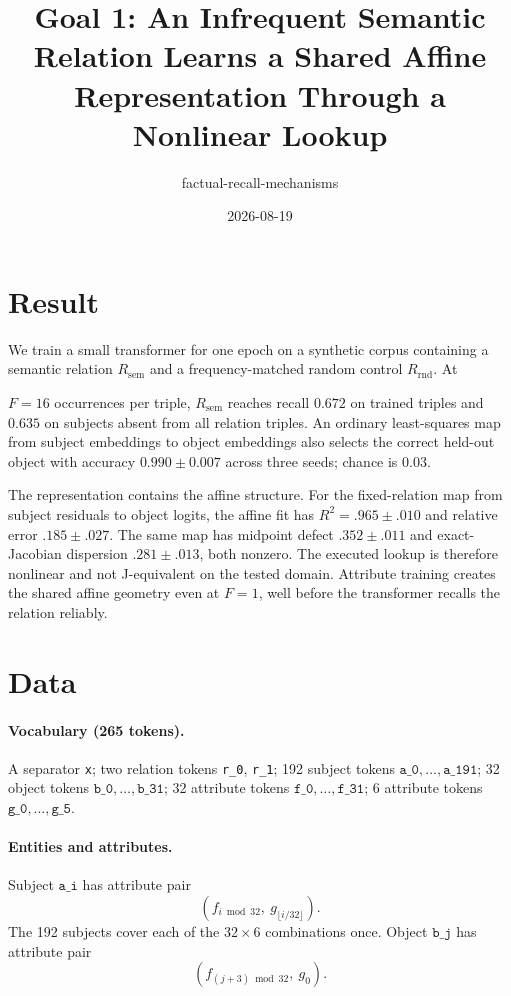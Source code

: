 \documentclass[11pt]{article}
\title{Goal 1: An Infrequent Semantic Relation Learns a Shared Affine Representation Through a Nonlinear Lookup}
\author{factual-recall-mechanisms}
\date{2026-08-19}
\newcommand{\sep}{\texttt{x}}
\newcommand{\subj}[1]{\texttt{a\_#1}}
\newcommand{\obj}[1]{\texttt{b\_#1}}
\newcommand{\rel}[1]{\texttt{r\_#1}}
\newcommand{\fatt}[1]{\texttt{f\_#1}}
\newcommand{\gatt}[1]{\texttt{g\_#1}}
\newcommand{\Rsem}{R_{\mathrm{sem}}}
\newcommand{\Rrnd}{R_{\mathrm{rnd}}}
\providecommand{\enote}[2]{}
\begin{document}
\maketitle

\section{Result}

We train a small transformer for one epoch on a synthetic corpus containing a
semantic relation $\Rsem$ and a frequency-matched random control $\Rrnd$.  At
\enote{hs}{``exactly one epoch'' is completely vacuous?}
$F{=}16$ occurrences per triple, $\Rsem$ reaches recall $0.672$ on trained triples
and $0.635$ on subjects absent from all relation triples.  An ordinary least-squares
map from subject embeddings to object embeddings also selects the correct held-out
object with accuracy $0.990\pm0.007$ across three seeds; chance is $0.03$.
\enote{hs}{but the important question is whether the object of a held-out triple
is correctly predicted, not the subject? -- now i understand. nice!}

The representation contains the affine structure.  For the fixed-relation map
from subject residuals to object logits, the affine fit
has $R^2=.965\pm.010$ and relative error $.185\pm.027$.  The same map has midpoint
defect $.352\pm.011$ and exact-Jacobian dispersion $.281\pm.013$, both nonzero.
The executed lookup is therefore nonlinear and not J-equivalent on the tested
domain.  Attribute training creates the shared affine geometry even at $F{=}1$,
well before the transformer recalls the relation reliably.

\section{Data}

\paragraph{Vocabulary (265 tokens).}
A separator \sep; two relation tokens \rel{0}, \rel{1}; 192 subject tokens $\subj{0},\dots,\subj{191}$; 32 object tokens $\obj{0},\dots,\obj{31}$; 32 attribute tokens $\fatt{0},\dots,\fatt{31}$; 6 attribute tokens $\gatt{0},\dots,\gatt{5}$.

\paragraph{Entities and attributes.}
Subject $\subj{i}$ has attribute pair
\[
  (f_{i \bmod 32},\ g_{\lfloor i/32\rfloor}).
\]
The 192 subjects cover each of the $32\times6$ combinations once.  Object
$\obj{j}$ has attribute pair
\[
  (f_{(j+3) \bmod 32},\ g_0).
\]
\end{document}
